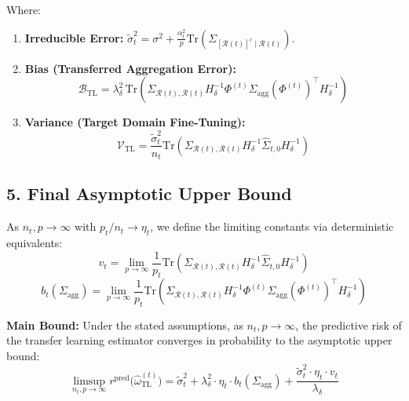 \documentclass{article}
\begin{document}
Where:
\begin{enumerate}
    \item \textbf{Irreducible Error:} $\tilde{\sigma}_t^2 = \sigma^2 + \frac{\alpha_t^2}{p}\mathrm{Tr}(\Sigma_{[\mathcal{R}(t)]^c \mid \mathcal{R}(t)})$.
    \item \textbf{Bias (Transferred Aggregation Error):} 
    \[
    \mathcal{B}_{\mathrm{TL}} = \lambda_\delta^2 \, \mathrm{Tr}\left( \Sigma_{\mathcal{R}(t),\mathcal{R}(t)} H_\delta^{-1} \Phi^{(t)} \Sigma_{\mathrm{agg}} (\Phi^{(t)})^\top H_\delta^{-1} \right)
    \]
    \item \textbf{Variance (Target Domain Fine-Tuning):}
    \[
    \mathcal{V}_{\mathrm{TL}} = \frac{\tilde{\sigma}_t^2}{n_t} \mathrm{Tr}\left( \Sigma_{\mathcal{R}(t),\mathcal{R}(t)} H_\delta^{-1} \hat{\Sigma}_{t,0} H_\delta^{-1} \right)
    \]
\end{enumerate}

\subsection*{5. Final Asymptotic Upper Bound}

As $n_t, p \to \infty$ with $p_t/n_t \to \eta_t$, we define the limiting constants via deterministic equivalents:
\[
v_t = \lim_{p \to \infty} \frac{1}{p_t} \mathrm{Tr}\left( \Sigma_{\mathcal{R}(t),\mathcal{R}(t)} H_\delta^{-1} \hat{\Sigma}_{t,0} H_\delta^{-1} \right)
\]
\[
b_t(\Sigma_{\mathrm{agg}}) = \lim_{p \to \infty} \frac{1}{p_t} \mathrm{Tr}\left( \Sigma_{\mathcal{R}(t),\mathcal{R}(t)} H_\delta^{-1} \Phi^{(t)} \Sigma_{\mathrm{agg}} (\Phi^{(t)})^\top H_\delta^{-1} \right)
\]

\textbf{Main Bound:} Under the stated assumptions, as $n_t, p \to \infty$, the predictive risk of the transfer learning estimator converges in probability to the asymptotic upper bound:
\[
\limsup_{n_t, p \to \infty} r^{\mathrm{pred}}\bigl(\hat\omega_{\mathrm{TL}}^{(t)}\bigr) = \tilde{\sigma}_t^2 + \lambda_\delta^2 \cdot \eta_t \cdot b_t(\Sigma_{\mathrm{agg}}) + \frac{\tilde{\sigma}_t^2 \cdot \eta_t \cdot v_t}{\lambda_\delta}
\]
\end{document}
